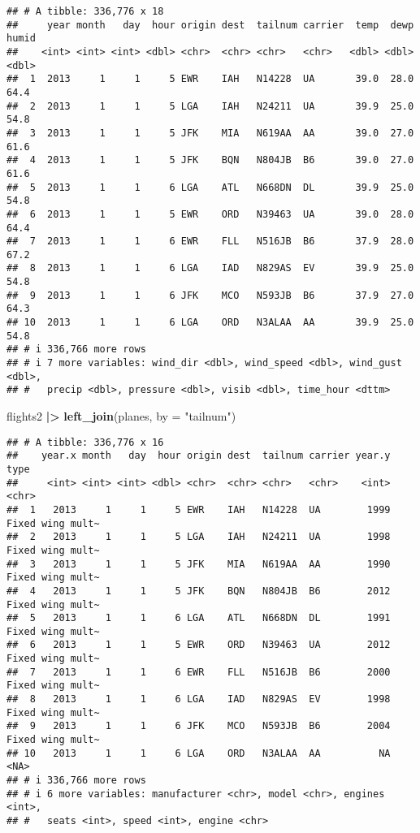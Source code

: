 \documentclass[
]{article}
\newenvironment{Shaded}{\begin{snugshade}}{\end{snugshade}}
\newcommand{\AttributeTok}[1]{\textcolor[rgb]{0.13,0.29,0.53}{#1}}
\newcommand{\FunctionTok}[1]{\textcolor[rgb]{0.13,0.29,0.53}{\textbf{#1}}}
\newcommand{\NormalTok}[1]{#1}
\newcommand{\SpecialCharTok}[1]{\textcolor[rgb]{0.81,0.36,0.00}{\textbf{#1}}}
\newcommand{\StringTok}[1]{\textcolor[rgb]{0.31,0.60,0.02}{#1}}
\begin{document}
\begin{verbatim}
## # A tibble: 336,776 x 18
##     year month   day  hour origin dest  tailnum carrier  temp  dewp humid
##    <int> <int> <int> <dbl> <chr>  <chr> <chr>   <chr>   <dbl> <dbl> <dbl>
##  1  2013     1     1     5 EWR    IAH   N14228  UA       39.0  28.0  64.4
##  2  2013     1     1     5 LGA    IAH   N24211  UA       39.9  25.0  54.8
##  3  2013     1     1     5 JFK    MIA   N619AA  AA       39.0  27.0  61.6
##  4  2013     1     1     5 JFK    BQN   N804JB  B6       39.0  27.0  61.6
##  5  2013     1     1     6 LGA    ATL   N668DN  DL       39.9  25.0  54.8
##  6  2013     1     1     5 EWR    ORD   N39463  UA       39.0  28.0  64.4
##  7  2013     1     1     6 EWR    FLL   N516JB  B6       37.9  28.0  67.2
##  8  2013     1     1     6 LGA    IAD   N829AS  EV       39.9  25.0  54.8
##  9  2013     1     1     6 JFK    MCO   N593JB  B6       37.9  27.0  64.3
## 10  2013     1     1     6 LGA    ORD   N3ALAA  AA       39.9  25.0  54.8
## # i 336,766 more rows
## # i 7 more variables: wind_dir <dbl>, wind_speed <dbl>, wind_gust <dbl>,
## #   precip <dbl>, pressure <dbl>, visib <dbl>, time_hour <dttm>
\end{verbatim}

\begin{Shaded}
\begin{Highlighting}[]
\NormalTok{flights2 }\SpecialCharTok{|\textgreater{}}
  \FunctionTok{left\_join}\NormalTok{(planes, }\AttributeTok{by =} \StringTok{"tailnum"}\NormalTok{)}
\end{Highlighting}
\end{Shaded}

\begin{verbatim}
## # A tibble: 336,776 x 16
##    year.x month   day  hour origin dest  tailnum carrier year.y type            
##     <int> <int> <int> <dbl> <chr>  <chr> <chr>   <chr>    <int> <chr>           
##  1   2013     1     1     5 EWR    IAH   N14228  UA        1999 Fixed wing mult~
##  2   2013     1     1     5 LGA    IAH   N24211  UA        1998 Fixed wing mult~
##  3   2013     1     1     5 JFK    MIA   N619AA  AA        1990 Fixed wing mult~
##  4   2013     1     1     5 JFK    BQN   N804JB  B6        2012 Fixed wing mult~
##  5   2013     1     1     6 LGA    ATL   N668DN  DL        1991 Fixed wing mult~
##  6   2013     1     1     5 EWR    ORD   N39463  UA        2012 Fixed wing mult~
##  7   2013     1     1     6 EWR    FLL   N516JB  B6        2000 Fixed wing mult~
##  8   2013     1     1     6 LGA    IAD   N829AS  EV        1998 Fixed wing mult~
##  9   2013     1     1     6 JFK    MCO   N593JB  B6        2004 Fixed wing mult~
## 10   2013     1     1     6 LGA    ORD   N3ALAA  AA          NA <NA>            
## # i 336,766 more rows
## # i 6 more variables: manufacturer <chr>, model <chr>, engines <int>,
## #   seats <int>, speed <int>, engine <chr>
\end{verbatim}
\end{document}
